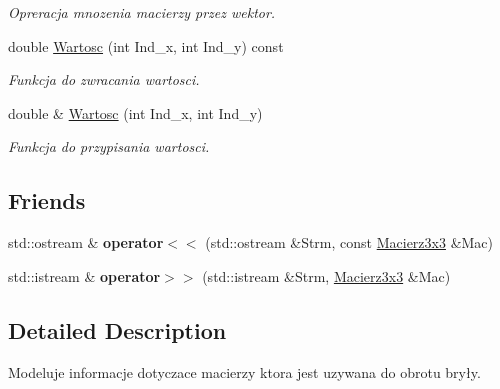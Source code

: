\begin{DoxyCompactItemize}
\begin{DoxyCompactList}\small\item\em Opreracja mnozenia macierzy przez wektor. \end{DoxyCompactList}\item 
\hypertarget{class_macierz3x3_a3e09ad6cbfe1c9056231c08f70157db9}{double \hyperlink{class_macierz3x3_a3e09ad6cbfe1c9056231c08f70157db9}{Wartosc} (int Ind\+\_\+x, int Ind\+\_\+y) const }\label{class_macierz3x3_a3e09ad6cbfe1c9056231c08f70157db9}

\begin{DoxyCompactList}\small\item\em Funkcja do zwracania wartosci. \end{DoxyCompactList}\item 
\hypertarget{class_macierz3x3_a0d5c47eb2244de4bb55bd738dfc6e151}{double \& \hyperlink{class_macierz3x3_a0d5c47eb2244de4bb55bd738dfc6e151}{Wartosc} (int Ind\+\_\+x, int Ind\+\_\+y)}\label{class_macierz3x3_a0d5c47eb2244de4bb55bd738dfc6e151}

\begin{DoxyCompactList}\small\item\em Funkcja do przypisania wartosci. \end{DoxyCompactList}\end{DoxyCompactItemize}
\subsection*{Friends}
\begin{DoxyCompactItemize}
\item 
\hypertarget{class_macierz3x3_a7d624426c40b579f848005cc55b24ea6}{std\+::ostream \& {\bfseries operator$<$$<$} (std\+::ostream \&Strm, const \hyperlink{class_macierz3x3}{Macierz3x3} \&Mac)}\label{class_macierz3x3_a7d624426c40b579f848005cc55b24ea6}

\item 
\hypertarget{class_macierz3x3_a7ad250d858c386e1ddc4ce17e3b885b5}{std\+::istream \& {\bfseries operator$>$$>$} (std\+::istream \&Strm, \hyperlink{class_macierz3x3}{Macierz3x3} \&Mac)}\label{class_macierz3x3_a7ad250d858c386e1ddc4ce17e3b885b5}

\end{DoxyCompactItemize}


\subsection{Detailed Description}
Modeluje informacje dotyczace macierzy ktora jest uzywana do obrotu bryły. 

